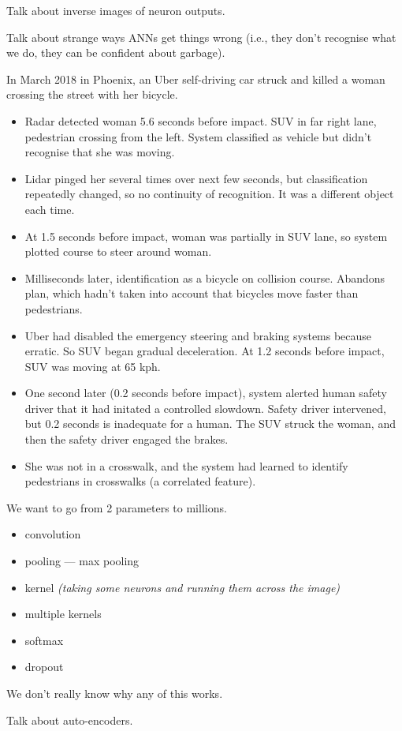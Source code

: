 Talk about inverse images of neuron outputs.

Talk about strange ways ANNs get things wrong (i.e., they don't
recognise what we do, they can be confident about garbage).



In March 2018 in Phoenix, an Uber self-driving car struck and killed a
woman crossing the street with her bicycle.

\begin{itemize}
\item Radar detected woman 5.6 seconds before impact.  SUV in far
  right lane, pedestrian crossing from the left.  System classified as
  vehicle but didn't recognise that she was moving.
\item Lidar pinged her several times over next few seconds, but
  classification repeatedly changed, so no continuity of recognition.
  It was a different object each time.
\item At 1.5 seconds before impact, woman was partially in SUV lane,
  so system plotted course to steer around woman.
\item Milliseconds later, identification as a bicycle on collision
  course.  Abandons plan, which hadn't taken into account that
  bicycles move faster than pedestrians.
\item Uber had disabled the emergency steering and braking systems
  because erratic.  So SUV began gradual deceleration.  At 1.2 seconds
  before impact, SUV was moving at 65 kph.
\item One second later (0.2 seconds before impact), system alerted
  human safety driver that it had initated a controlled slowdown.
  Safety driver intervened, but 0.2 seconds is inadequate for a
  human.  The SUV struck the woman, and then the safety driver engaged
  the brakes.
\item She was not in a crosswalk, and the system had learned to
  identify pedestrians in crosswalks (a correlated feature).
\end{itemize}



We want to go from 2 parameters to millions.

\begin{itemize}
\item convolution
\item pooling --- max pooling
\item kernel \textit{(taking some neurons and running them across the image)}
\item multiple kernels
\item softmax
\item dropout
\end{itemize}

We don't really know why any of this works.

Talk about auto-encoders.


